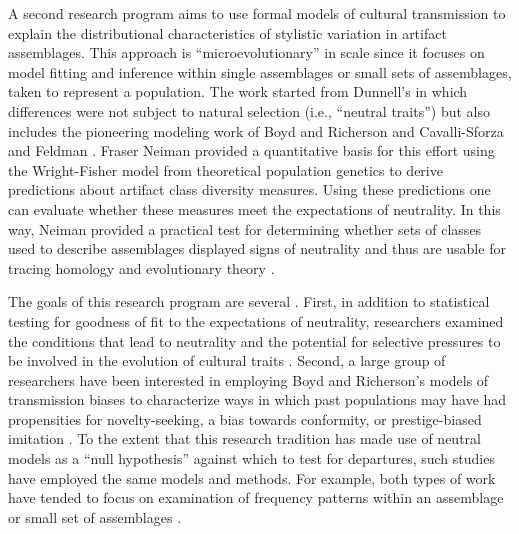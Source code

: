 A second research program aims to use formal models of cultural transmission to explain the distributional characteristics of stylistic variation in artifact assemblages.  This approach is ``microevolutionary'' in scale since it focuses on model fitting and inference within single assemblages or small sets of assemblages, taken to represent a population.  The work started from Dunnell's \citeyearpar{Dunnell1978} in which differences were not subject to natural selection (i.e., ``neutral traits'') but also includes the pioneering modeling work of Boyd and Richerson \citeyearpar{BR1985} and Cavalli-Sforza and Feldman \citeyearpar{CF1981}.  Fraser Neiman \citeyearpar{Neiman1995} provided a quantitative basis for this effort using the Wright-Fisher model from theoretical population genetics to derive predictions about artifact class diversity measures. Using these predictions one can evaluate whether these measures meet the expectations of neutrality.  In  this way, Neiman provided a practical test for determining whether sets of classes used to describe assemblages displayed signs of neutrality and thus are usable for tracing homology and evolutionary theory \citep{eerkens2006cultural,Eerkens2007a,Lipo1997,Lipo2000,Lipo2006}.  

The goals of this research program are several \citep{marwick2005can}.  First, in addition to statistical testing for goodness of fit to the expectations of neutrality, researchers examined the conditions that lead to neutrality and the potential for selective pressures to be involved in the evolution of cultural traits \citep{bettinger1999point,Bettinger2008,Eerkens2005,Evans2011,Pfeffer2001,steele2010ceramic,Wilhelmsen2001}.   Second, a large group of researchers have been interested in employing Boyd and Richerson's \citeyearpar{BR1985} models of transmission biases to characterize ways in which past populations may have had propensities for novelty-seeking, a bias towards conformity, or prestige-biased imitation  \citep{acerbi2014biases,Bentley2001,8913,Bentley2003,8914,bentley2004random,Bentley2007b,bettinger1999point,Herzog2004,Kohler2004,mesoudi2009random,Shennan2001ceramic,shennan2008style}.  To the extent that this research tradition has made use of neutral models as a ``null hypothesis'' against which to test for departures, such studies have employed the same models and methods.  For example, both types of work have tended to focus on examination of frequency patterns within an assemblage or small set of assemblages \citep[see the detailed reviews by][]{kandler2019analysing,walsh2019introduction}.

